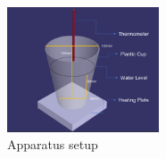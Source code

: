 \begin{figure}[h]
    \centering
    \includegraphics[width=0.40\textwidth]{Heating-cup.png}
    \caption{Apparatus setup}
    \label{}
\end{figure}